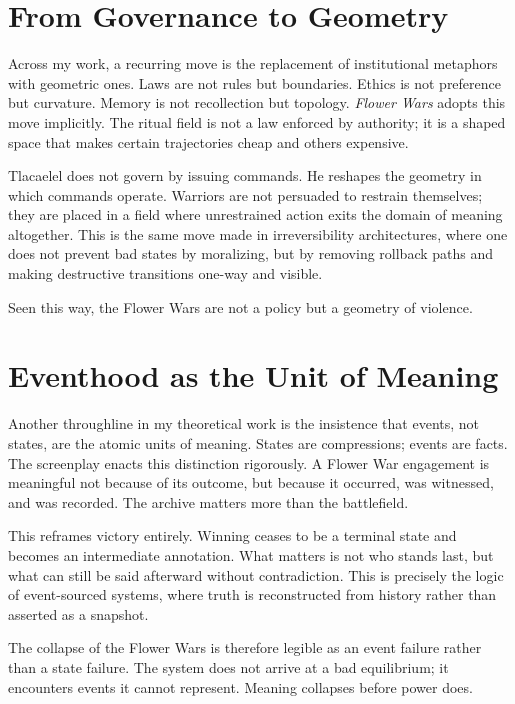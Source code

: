 \documentclass[12pt]{article}
\begin{document}
\section*{From Governance to Geometry}

Across my work, a recurring move is the replacement of institutional metaphors with geometric ones. Laws are not rules but boundaries. Ethics is not preference but curvature. Memory is not recollection but topology. \textit{Flower Wars} adopts this move implicitly. The ritual field is not a law enforced by authority; it is a shaped space that makes certain trajectories cheap and others expensive.

Tlacaelel does not govern by issuing commands. He reshapes the geometry in which commands operate. Warriors are not persuaded to restrain themselves; they are placed in a field where unrestrained action exits the domain of meaning altogether. This is the same move made in irreversibility architectures, where one does not prevent bad states by moralizing, but by removing rollback paths and making destructive transitions one-way and visible.

Seen this way, the Flower Wars are not a policy but a geometry of violence.

\section*{Eventhood as the Unit of Meaning}

Another throughline in my theoretical work is the insistence that events, not states, are the atomic units of meaning. States are compressions; events are facts. The screenplay enacts this distinction rigorously. A Flower War engagement is meaningful not because of its outcome, but because it occurred, was witnessed, and was recorded. The archive matters more than the battlefield.

This reframes victory entirely. Winning ceases to be a terminal state and becomes an intermediate annotation. What matters is not who stands last, but what can still be said afterward without contradiction. This is precisely the logic of event-sourced systems, where truth is reconstructed from history rather than asserted as a snapshot.

The collapse of the Flower Wars is therefore legible as an event failure rather than a state failure. The system does not arrive at a bad equilibrium; it encounters events it cannot represent. Meaning collapses before power does.
\end{document}
